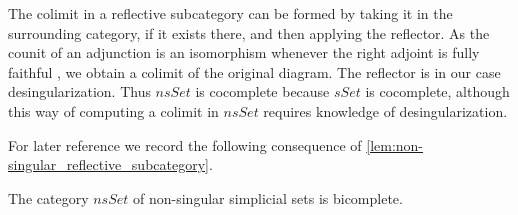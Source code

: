 The colimit in a reflective subcategory can be formed by taking it in the surrounding category, if it exists there, and then applying the reflector. As the counit of an adjunction is an isomorphism whenever the right adjoint is fully faithful \cite[§IV.3~Thm.1]{ML98}, we obtain a colimit of the original diagram. The reflector is in our case desingularization. Thus $nsSet$ is cocomplete because $sSet$ is cocomplete, although this way of computing a colimit in $nsSet$ requires knowledge of desingularization.

For later reference we record the following consequence of \cref{lem:non-singular_reflective_subcategory}.
\begin{corollary}\label{cor:nsSet_bicomplete}
The category $nsSet$ of non-singular simplicial sets is bicomplete.
\end{corollary}




